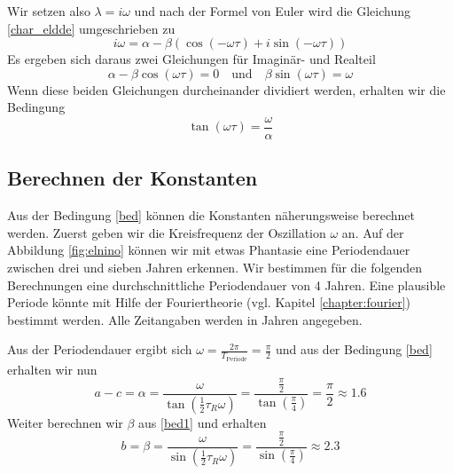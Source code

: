 Wir setzen also $\lambda = i\omega$ und nach der Formel von Euler wird die Gleichung \eqref{char_eldde} umgeschrieben zu 
\begin{equation}
	 i\omega = \alpha-\beta(\cos(-\omega \tau)+i\sin(-\omega \tau))
\end{equation}
Es ergeben sich daraus zwei Gleichungen für Imaginär- und Realteil
\begin{equation} \label{bed1}
  	\alpha-\beta\cos(\omega \tau) = 0 \quad\text{und}\quad \beta\sin(\omega\tau)=\omega
\end{equation}
Wenn diese beiden Gleichungen durcheinander dividiert werden, erhalten wir die Bedingung
\begin{equation} \label{bed}
	\tan(\omega\tau)=\frac{\omega}{\alpha}
\end{equation}
 
\subsection{Berechnen der Konstanten}
Aus der Bedingung \eqref{bed} können die Konstanten näherungsweise berechnet werden.
Zuerst geben wir die Kreisfrequenz der Oszillation $\omega$ an. 
Auf der Abbildung \ref{fig:elnino} können wir mit etwas Phantasie eine Periodendauer zwischen drei und sieben Jahren erkennen.
Wir bestimmen für die folgenden Berechnungen eine durchschnittliche Periodendauer von 4 Jahren. 
Eine plausible Periode könnte mit Hilfe der Fouriertheorie (vgl. Kapitel \ref{chapter:fourier}) bestimmt werden.
Alle Zeitangaben werden in Jahren angegeben.

Aus der Periodendauer ergibt sich $\omega = \frac{2\pi}{T_\text{Periode}} = \frac{\pi}{2}$ und aus der Bedingung \eqref{bed} erhalten wir nun 
\begin{equation}
	a-c=\alpha=\frac{\omega}{\tan(\frac{1}{2}\tau_R \omega)}=\frac{\frac{\pi}{2}}{\tan(\frac{\pi}{4})}=\frac{\pi}{2}\approx 1.6
\end{equation}
Weiter berechnen wir $\beta$ aus \eqref{bed1} und erhalten
\begin{equation}
	b=\beta=\frac{\omega}{\sin(\frac{1}{2}\tau_R \omega)}=\frac{\frac{\pi}{2}}{\sin(\frac{\pi}{4})}\approx 2.3
\end{equation}

